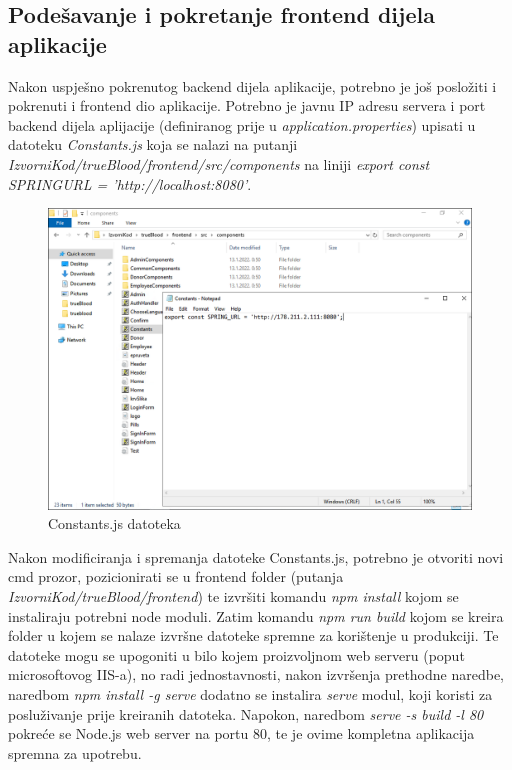 			\subsection{Podešavanje i pokretanje frontend dijela aplikacije}
			Nakon uspješno pokrenutog backend dijela aplikacije, potrebno je još posložiti i pokrenuti i frontend dio aplikacije. Potrebno je javnu IP adresu servera i port backend dijela aplijacije (definiranog prije u \textit{application.properties}) upisati u datoteku \textit{Constants.js} koja se nalazi na putanji \textit{IzvorniKod/trueBlood/frontend/src/components} na liniji \textit{export const SPRINGURL = 'http://localhost:8080'}.
		
			\begin{figure}[H]
			\centering
			\includegraphics[width=\textwidth, scale=0.5]{slike/ConstantsJs}
			\caption{Constants.js datoteka}
			\label{fig:ConstantsJs}
			\end{figure}
			\eject
			Nakon modificiranja i spremanja datoteke Constants.js, potrebno je otvoriti novi cmd prozor, pozicionirati se u frontend folder (putanja \textit{IzvorniKod/trueBlood/frontend}) te izvršiti komandu \textit{npm install} kojom se instaliraju potrebni node moduli. Zatim komandu \textit{npm run build} kojom se kreira folder u kojem se nalaze izvršne datoteke spremne za korištenje u produkciji. Te datoteke mogu se upogoniti u bilo kojem proizvoljnom web serveru (poput microsoftovog IIS-a), no radi jednostavnosti, nakon izvršenja prethodne naredbe, naredbom \textit{npm install -g serve} dodatno se instalira \textit{serve} modul, koji koristi za posluživanje prije kreiranih datoteka. Napokon, naredbom \textit{serve -s build -l 80} pokreće se Node.js web server na portu 80, te je ovime kompletna aplikacija spremna za upotrebu.
			
